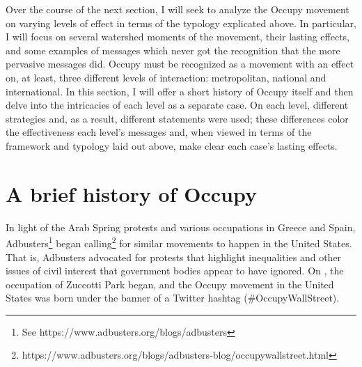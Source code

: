 \documentclass{article}
\begin{document}



Over the course of the next section, I will seek to analyze the Occupy movement on varying levels of effect in terms of the typology explicated above.
In particular, I will focus on several watershed moments of the movement, their lasting effects, and some examples of messages which never got the recognition that the more pervasive messages did.
Occupy must be recognized as a movement with an effect on, at least, three different levels of interaction: metropolitan, national and international.
In this section, I will offer a short history of Occupy itself and then delve into the intricacies of each level as a separate case.
On each level, different strategies and, as a result, different statements were used; these differences color the effectiveness each level's messages and, when viewed in terms of the framework and typology laid out above, make clear each case's lasting effects.


\section{A brief history of Occupy}
In light of the Arab Spring protests and various occupations in Greece and Spain, Adbusters\footnote{See https://www.adbusters.org/blogs/adbusters} began calling\footnote{https://www.adbusters.org/blogs/adbusters-blog/occupywallstreet.html} for similar movements to happen in the United States.
That is, Adbusters advocated for protests that highlight inequalities and other issues of civil interest that government bodies appear to have ignored.
On , the occupation of Zuccotti Park began, and the Occupy movement in the United States was born under the banner of a Twitter hashtag (\#OccupyWallStreet).
\end{document}
